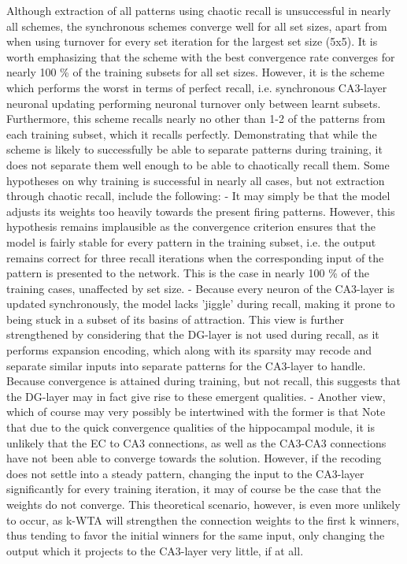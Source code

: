 Although extraction of all patterns using chaotic recall is unsuccessful in nearly all schemes, the synchronous schemes converge well for all set sizes, apart from when using turnover for every set iteration for the largest set size (5x5). It is worth emphasizing that the scheme with the best convergence rate converges for nearly 100 \% of the training subsets for all set sizes. However, it is the scheme which performs the worst in terms of perfect recall, i.e. synchronous CA3-layer neuronal updating performing neuronal turnover only between learnt subsets. Furthermore, this scheme recalls nearly no other than 1-2 of the patterns from each training subset, which it recalls perfectly. Demonstrating that while the scheme is likely to successfully be able to separate patterns during training, it does not separate them well enough to be able to chaotically recall them.
Some hypotheses on why training is successful in nearly all cases, but not extraction through chaotic recall, include the following:
- It may simply be that the model adjusts its weights too heavily towards the present firing patterns. However, this hypothesis remains implausible as the convergence criterion ensures that the model is fairly stable for every pattern in the training subset, i.e. the output remains correct for three recall iterations when the corresponding input of the pattern is presented to the network. This is the case in nearly 100 \% of the training cases, unaffected by set size.
- Because every neuron of the CA3-layer is updated synchronously, the model lacks 'jiggle' during recall, making it prone to being stuck in a subset of its basins of attraction. This view is further strengthened by considering that the DG-layer is not used during recall, as it performs expansion encoding, which along with its sparsity may recode and separate similar inputs into separate patterns for the CA3-layer to handle. Because convergence is attained during training, but not recall, this suggests that the DG-layer may in fact give rise to these emergent qualities.
- Another view, which of course may very possibly be intertwined with the former is that
Note that due to the quick convergence qualities of the hippocampal module, it is unlikely that the EC to CA3 connections, as well as the CA3-CA3 connections have not been able to converge towards the solution. However, if the recoding does not settle into a steady pattern, changing the input to the CA3-layer significantly for every training iteration, it may of course be the case that the weights do not converge. This theoretical scenario, however, is even more unlikely to occur, as k-WTA will strengthen the connection weights to the first k winners, thus tending to favor the initial winners for the same input, only changing the output which it projects to the CA3-layer very little, if at all. 
